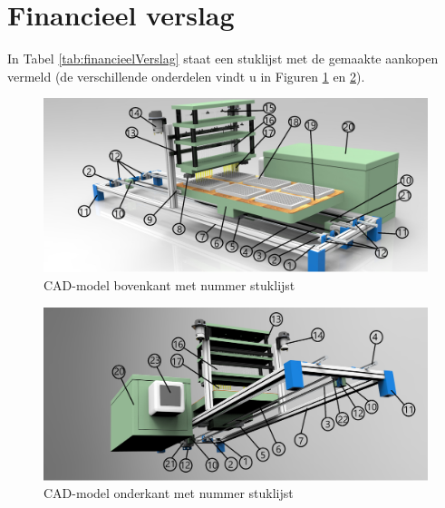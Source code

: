 \documentclass[a4paper,twoside,kulak]{kulakreport} %
\begin{document}
\section*{Financieel verslag}
\label{Appendix: Financieel verslag}

In Tabel \ref{tab:financieelVerslag} staat een stuklijst met de gemaakte aankopen vermeld (de verschillende onderdelen vindt u in Figuren \ref{fig: renderingBovenkantStuklijst} en \ref{fig: renderingOnderkantStuklijst}). 


\begin{figure}[h]
	\centering
	\includegraphics[width=\textwidth]{renderingBovenaanStuklijst.png}
	\caption{CAD-model bovenkant met nummer stuklijst}
	\label{fig: renderingBovenkantStuklijst}
	
\end{figure} 

\begin{figure}[h]
	\centering
	\includegraphics[width=\textwidth]{renderingOnderaanStuklijst.png}
	\caption{CAD-model onderkant met nummer stuklijst}
	\label{fig: renderingOnderkantStuklijst}
	
\end{figure} 

		
\end{document}
